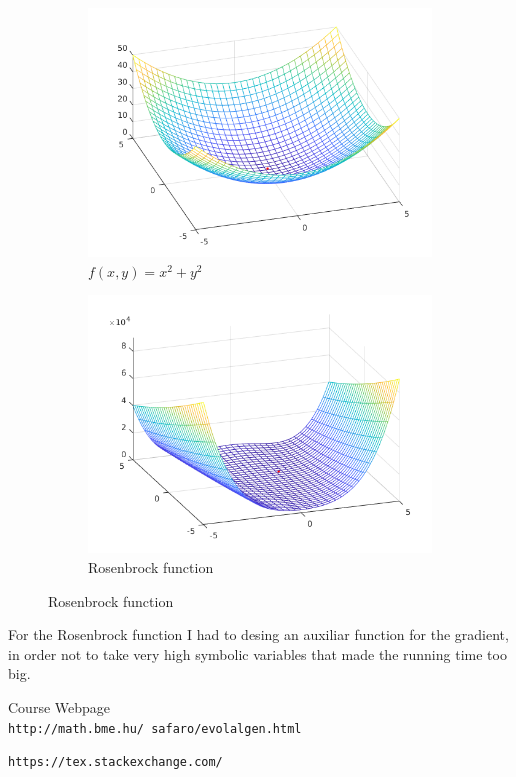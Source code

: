 \documentclass[12pt,english]{article}
\begin{document}
\begin{enumerate}
		\begin{figure}[H]
		    \centering
		    \begin{subfigure}[b]{0.45\textwidth}
		        \includegraphics[width=\textwidth]{first}
		        \caption{$f(x,y)=x^2+y^2$}
		    \end{subfigure}
		    \begin{subfigure}[b]{0.45\textwidth}
		        \includegraphics[width=\textwidth]{rosenbrock}
		        \caption{Rosenbrock function}
		    \end{subfigure}
		\end{figure}
		For the Rosenbrock function I had to desing an auxiliar function for the gradient, in order not to take very high symbolic variables that made the running time too big.
\end{enumerate}


\begin{thebibliography}{9}

Course Webpage
\\\texttt{http://math.bme.hu/~safaro/evolalgen.html}


\texttt{https://tex.stackexchange.com/}


\end{thebibliography}
\end{document}
